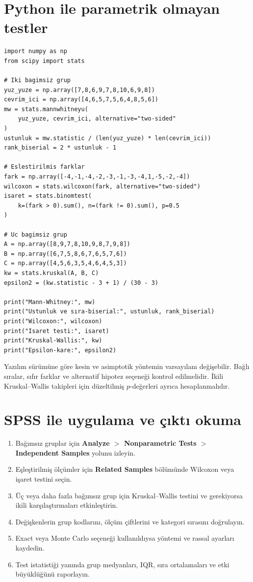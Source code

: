 \section{Python ile parametrik olmayan testler}

\begin{lstlisting}
import numpy as np
from scipy import stats

# Iki bagimsiz grup
yuz_yuze = np.array([7,8,6,9,7,8,10,6,9,8])
cevrim_ici = np.array([4,6,5,7,5,6,4,8,5,6])
mw = stats.mannwhitneyu(
    yuz_yuze, cevrim_ici, alternative="two-sided"
)
ustunluk = mw.statistic / (len(yuz_yuze) * len(cevrim_ici))
rank_biserial = 2 * ustunluk - 1

# Eslestirilmis farklar
fark = np.array([-4,-1,-4,-2,-3,-1,-3,-4,1,-5,-2,-4])
wilcoxon = stats.wilcoxon(fark, alternative="two-sided")
isaret = stats.binomtest(
    k=(fark > 0).sum(), n=(fark != 0).sum(), p=0.5
)

# Uc bagimsiz grup
A = np.array([8,9,7,8,10,9,8,7,9,8])
B = np.array([6,7,5,8,6,7,6,5,7,6])
C = np.array([4,5,6,3,5,4,6,4,5,3])
kw = stats.kruskal(A, B, C)
epsilon2 = (kw.statistic - 3 + 1) / (30 - 3)

print("Mann-Whitney:", mw)
print("Ustunluk ve sıra-biserial:", ustunluk, rank_biserial)
print("Wilcoxon:", wilcoxon)
print("Isaret testi:", isaret)
print("Kruskal-Wallis:", kw)
print("Epsilon-kare:", epsilon2)
\end{lstlisting}

Yazılım sürümüne göre kesin ve asimptotik yöntemin varsayılanı değişebilir.
Bağlı sıralar, sıfır farklar ve alternatif hipotez seçeneği kontrol edilmelidir.
İkili Kruskal--Wallis takipleri için düzeltilmiş $p$-değerleri ayrıca
hesaplanmalıdır.

\section{SPSS ile uygulama ve çıktı okuma}

\begin{enumerate}
  \item Bağımsız gruplar için \textbf{Analyze $>$ Nonparametric Tests $>$ Independent Samples} yolunu izleyin.
  \item Eşleştirilmiş ölçümler için \textbf{Related Samples} bölümünde Wilcoxon veya işaret testini seçin.
  \item Üç veya daha fazla bağımsız grup için Kruskal--Wallis testini ve gerekiyorsa ikili karşılaştırmaları etkinleştirin.
  \item Değişkenlerin grup kodlarını, ölçüm çiftlerini ve kategori sırasını doğrulayın.
  \item Exact veya Monte Carlo seçeneği kullanıldıysa yöntemi ve rassal ayarları kaydedin.
  \item Test istatistiği yanında grup medyanları, IQR, sıra ortalamaları ve etki büyüklüğünü raporlayın.
\end{enumerate}

